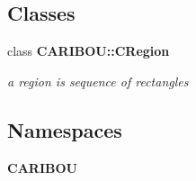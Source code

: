\subsection*{Classes}
\begin{DoxyCompactItemize}
\item 
class {\bf C\+A\+R\+I\+B\+O\+U\+::\+C\+Region}
\begin{DoxyCompactList}\small\item\em a region is sequence of rectangles \end{DoxyCompactList}\end{DoxyCompactItemize}
\subsection*{Namespaces}
\begin{DoxyCompactItemize}
\item 
 {\bf C\+A\+R\+I\+B\+OU}
\end{DoxyCompactItemize}
